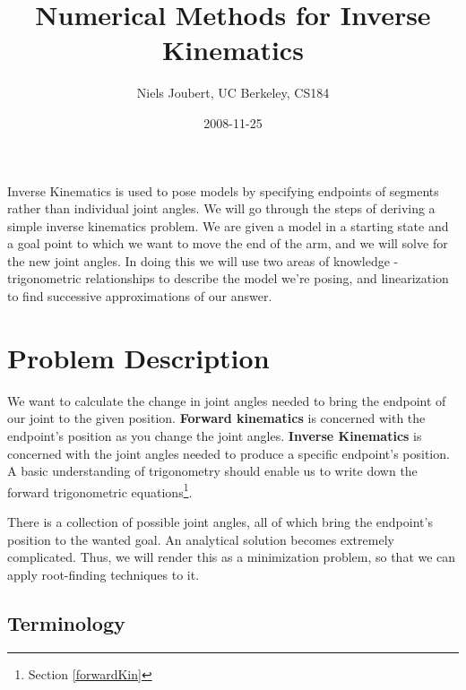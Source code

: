 \documentclass[]{article}
\title{Numerical Methods for Inverse Kinematics}
\author{ Niels Joubert, UC Berkeley, CS184 }
\date{2008-11-25}
\begin{document}
\ifpdf
{}
\else
{}
\fi

\maketitle

Inverse Kinematics is used to pose models by specifying endpoints of segments rather than individual joint angles. We will go through the steps of deriving a simple inverse kinematics problem. We are given a model in a starting state and a goal point to which we want to move the end of the arm, and we will solve for the new joint angles. In doing this we will use two areas of knowledge - trigonometric relationships to describe the model we're posing, and linearization to find successive approximations of our answer.

\section{Problem Description}

We want to calculate the change in joint angles needed to bring the endpoint of our joint to the given position. \textbf{Forward kinematics} is concerned with the endpoint's position as you change the joint angles. \textbf{Inverse Kinematics} is concerned with the joint angles needed to produce a specific endpoint's position. A basic understanding of trigonometry should enable us to write down the forward trigonometric equations\footnote{Section \ref{forwardKin}}.

There is a collection of possible joint angles, all of which bring the endpoint's position to the wanted goal. An analytical solution becomes extremely complicated. Thus, we will render this as a minimization problem, so that we can apply root-finding techniques to it. 

\subsection{Terminology}
\end{document}
